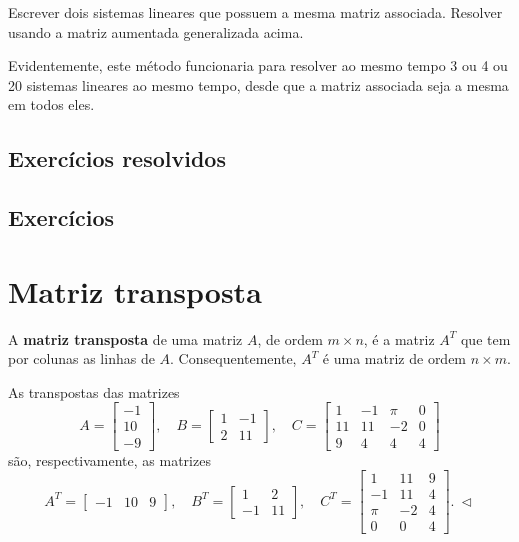 \documentclass[../livro.tex]{subfiles}  %
\begin{document}
\begin{exercise}
	Escrever dois sistemas lineares que possuem a mesma matriz associada. Resolver usando a matriz aumentada generalizada acima.
\end{exercise}

Evidentemente, este método funcionaria para resolver ao mesmo tempo 3 ou 4 ou 20 sistemas lineares ao mesmo tempo, desde que a matriz associada seja a mesma em todos eles.

\subsection*{Exercícios resolvidos}

\construirExeresol

\subsection*{Exercícios}

\construirExer


\section{Matriz transposta}


A \textbf{matriz transposta} de uma matriz $A$, de ordem $m\times n$, é a matriz $A^T$ que tem por colunas as linhas de $A$. Consequentemente, $A^T$ é uma matriz de ordem $n \times m$.

\begin{example}
	As transpostas das matrizes
	\begin{equation}
	A = \left[
	\begin{array}{c}
	-1  \\
	10  \\
	-9  
	\end{array}
	\right], \quad
	B = \left[
	\begin{array}{cc}
	1 & -1  \\
	2 & 11 
	\end{array}
	\right], \quad
	C = \left[
	\begin{array}{cccc}
	1  & -1 & \pi & 0 \\
	11 & 11 & -2  & 0 \\
	9  & 4  & 4   & 4 
	\end{array}
	\right]
	\end{equation} são, respectivamente, as matrizes
	\begin{equation}
	A^T = \left[
	\begin{array}{ccc}
	-1 & 10 & 9  
	\end{array}
	\right], \quad
	B^T = \left[
	\begin{array}{cc}
	1  & 2  \\
	-1 & 11 
	\end{array}
	\right], \quad
	C^T = \left[
	\begin{array}{ccc}
	1   & 11 & 9 \\
	-1  & 11 & 4 \\
	\pi & -2 & 4 \\
	0  & 0  & 4 
	\end{array}
	\right]. \ \lhd
	\end{equation}
\end{example}
\end{document}
